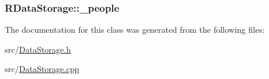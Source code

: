 \label{d5/d77/classRDataStorage_a52ce62ab5d9c9b28eec00519a47beda0}
\hypertarget{classRDataStorage_a20e069e5b53fe20e2e881bc69e226d3f}{
\subsubsection[{\_\-people}]{ {\bf RDataStorage::\_\-people}}}
\label{d5/d77/classRDataStorage_a20e069e5b53fe20e2e881bc69e226d3f}


The documentation for this class was generated from the following files:\begin{DoxyCompactItemize}
\item 
src/\hyperlink{DataStorage_8h}{DataStorage.h}\item 
src/\hyperlink{DataStorage_8cpp}{DataStorage.cpp}\end{DoxyCompactItemize}
